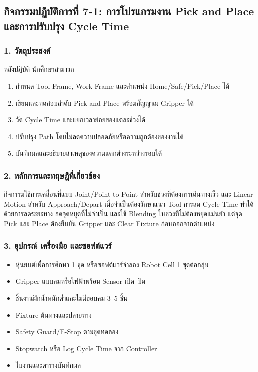 \subsection{กิจกรรมปฏิบัติการที่ 7-1: การโปรแกรมงาน Pick and Place และการปรับปรุง Cycle Time}

\subsubsection{1. วัตถุประสงค์}

หลังปฏิบัติ นักศึกษาสามารถ

\begin{enumerate}
    \item กำหนด Tool Frame, Work Frame และตำแหน่ง Home/Safe/Pick/Place ได้
    \item เขียนและทดสอบลำดับ Pick and Place พร้อมสัญญาณ Gripper ได้
    \item วัด Cycle Time และแยกเวลาย่อยของแต่ละช่วงได้
    \item ปรับปรุง Path โดยไม่ลดความปลอดภัยหรือความถูกต้องของงานได้
    \item บันทึกผลและอธิบายสาเหตุของความแตกต่างระหว่างรอบได้
\end{enumerate}

\subsubsection{2. หลักการและทฤษฎีที่เกี่ยวข้อง}

กิจกรรมใช้การเคลื่อนที่แบบ Joint/Point-to-Point สำหรับช่วงที่ต้องการเดินทางเร็ว และ Linear Motion สำหรับ Approach/Depart เมื่อจำเป็นต้องรักษาแนว Tool การลด Cycle Time ทำได้ด้วยการลดระยะทาง ลดจุดหยุดที่ไม่จำเป็น และใช้ Blending ในช่วงที่ไม่ต้องหยุดแม่นยำ แต่จุด Pick และ Place ต้องยืนยัน Gripper และ Clear Fixture ก่อนออกจากตำแหน่ง

\subsubsection{3. อุปกรณ์ เครื่องมือ และซอฟต์แวร์}

\begin{itemize}
    \item หุ่นยนต์เพื่อการศึกษา 1 ชุด หรือซอฟต์แวร์จำลอง Robot Cell 1 ชุดต่อกลุ่ม
    \item Gripper แบบลมหรือไฟฟ้าพร้อม Sensor เปิด–ปิด
    \item ชิ้นงานฝึกน้ำหนักต่ำและไม่มีขอบคม 3–5 ชิ้น
    \item Fixture ต้นทางและปลายทาง
    \item Safety Guard/E-Stop ตามชุดทดลอง
    \item Stopwatch หรือ Log Cycle Time จาก Controller
    \item ใบงานและตารางบันทึกผล
\end{itemize}

